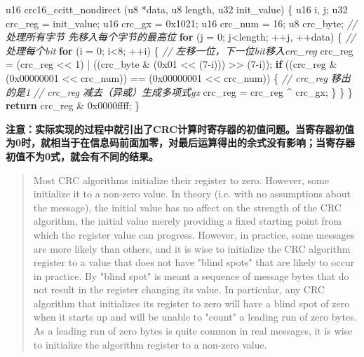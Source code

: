 \documentclass[
]{article}
\newenvironment{Shaded}{}{}
\newcommand{\BaseNTok}[1]{\textcolor[rgb]{0.25,0.63,0.44}{#1}}
\newcommand{\CommentTok}[1]{\textcolor[rgb]{0.38,0.63,0.69}{\textit{#1}}}
\newcommand{\ControlFlowTok}[1]{\textcolor[rgb]{0.00,0.44,0.13}{\textbf{#1}}}
\newcommand{\DecValTok}[1]{\textcolor[rgb]{0.25,0.63,0.44}{#1}}
\newcommand{\NormalTok}[1]{#1}
\begin{document}
\begin{Shaded}
\begin{Highlighting}[]
\NormalTok{u16 crc16\_ccitt\_nondirect (u8 *data, u8 length, u32 init\_value)}
\NormalTok{\{}
\NormalTok{	u16 i, j;}
\NormalTok{	u32 crc\_reg = init\_value;}
\NormalTok{	u16 crc\_gx = }\BaseNTok{0x1021}\NormalTok{;}
\NormalTok{	u16 crc\_num = }\DecValTok{16}\NormalTok{;}
\NormalTok{	u8 crc\_byte;}
    \CommentTok{// 处理所有字节 先移入每个字节的最高位}
	\ControlFlowTok{for}\NormalTok{ (j = }\DecValTok{0}\NormalTok{; j\textless{}length; ++j, ++data)}
\NormalTok{	\{}
		\CommentTok{// 处理每个bit}
		\ControlFlowTok{for}\NormalTok{ (i = }\DecValTok{0}\NormalTok{; i\textless{}}\DecValTok{8}\NormalTok{; ++i)}
\NormalTok{		\{}
            \CommentTok{// 左移一位，下一位bit移入crc\_reg}
\NormalTok{            crc\_reg = (crc\_reg \textless{}\textless{} }\DecValTok{1}\NormalTok{) | ((crc\_byte \& (}\BaseNTok{0x01}\NormalTok{ \textless{}\textless{} (}\DecValTok{7}\NormalTok{{-}i))) \textgreater{}\textgreater{} (}\DecValTok{7}\NormalTok{{-}i));}
			\ControlFlowTok{if}\NormalTok{ ((crc\_reg \& (}\BaseNTok{0x00000001}\NormalTok{ \textless{}\textless{} crc\_num)) == (}\BaseNTok{0x00000001}\NormalTok{ \textless{}\textless{} crc\_num))}
\NormalTok{			\{}
                \CommentTok{// crc\_reg 移出的是1}
				\CommentTok{// crc\_reg 减去（异或）生成多项式gx}
\NormalTok{                crc\_reg = crc\_reg \^{} crc\_gx;}
\NormalTok{			\}}
\NormalTok{		\}}
\NormalTok{	\}}
	\ControlFlowTok{return}\NormalTok{ crc\_reg \& }\BaseNTok{0x0000ffff}\NormalTok{; }
\NormalTok{\}}
\end{Highlighting}
\end{Shaded}

\textbf{注意：实际实现的过程中就引出了CRC计算时寄存器的初值问题。当寄存器初值为0时，就相当于在信息码前面加零，对最后运算得出的余式没有影响；当寄存器初值不为0式，就会有不同的结果。}

\begin{quote}
Most CRC algorithms initialize their register to zero. However, some
initialize it to a non-zero value. In theory (i.e. with no assumptions
about the message), the initial value has no affect on the strength of
the CRC algorithm, the initial value merely providing a fixed starting
point from which the register value can progress. However, in practice,
some messages are more likely than others, and it is wise to initialize
the CRC algorithm register to a value that does not have "blind spots"
that are likely to occur in practice. By "blind spot" is meant a
sequence of message bytes that do not result in the register changing
its value. In particular, any CRC algorithm that initializes its
register to zero will have a blind spot of zero when it starts up and
will be unable to "count" a leading run of zero bytes. As a leading run
of zero bytes is quite common in real messages, it is wise to initialize
the algorithm register to a non-zero value.
\end{quote}
\end{document}
